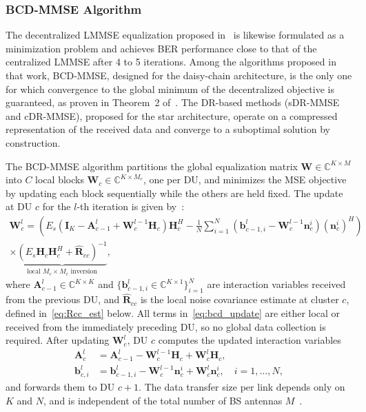 \documentclass[12pt]{article}
\begin{document}
\subsubsection{BCD-MMSE Algorithm}
\label{sec:bcdmmse}

The decentralized LMMSE equalization proposed in~\cite{zhao2025jsac} is
likewise formulated as a minimization problem and achieves BER performance
close to that of the centralized LMMSE after 4 to 5 iterations. Among the
algorithms proposed in that work, BCD-MMSE, designed for the daisy-chain
architecture, is the only one for which convergence to the global minimum
of the decentralized objective is guaranteed, as proven in Theorem~2
of~\cite{zhao2025jsac}. The DR-based methods (sDR-MMSE and cDR-MMSE),
proposed for the star architecture, operate on a compressed representation
of the received data and converge to a suboptimal solution by construction.

The BCD-MMSE algorithm partitions the global equalization matrix
$\mathbf{W} \in \mathbb{C}^{K \times M}$ into $C$ local blocks
$\mathbf{W}_c \in \mathbb{C}^{K \times M_c}$, one per DU, and minimizes
the MSE objective by updating each block sequentially while the others are
held fixed. The update at DU $c$ for the $l$-th iteration is
given by~\cite{zhao2025jsac}:
%
\begin{multline}
  \mathbf{W}_c^l = \left(
    E_s \left(\mathbf{I}_K - \mathbf{A}_{c-1}^l
    + \mathbf{W}_c^{l-1}\mathbf{H}_c\right)\mathbf{H}_c^H
    - \frac{1}{N}\sum_{i=1}^{N}
      \left(\mathbf{b}_{c-1,i}^l - \mathbf{W}_c^{l-1}\mathbf{n}_c^i\right)
      \left(\mathbf{n}_c^i\right)^H
  \right) \\
  \times
  \underbrace{
    \left(E_s \mathbf{H}_c \mathbf{H}_c^H
    + \hat{\mathbf{R}}_{cc}\right)^{-1}
  }_{\text{local } M_c \times M_c \text{ inversion}},
  \label{eq:bcd_update}
\end{multline}
%
where $\mathbf{A}_{c-1}^l \in \mathbb{C}^{K \times K}$ and
$\{\mathbf{b}_{c-1,i}^l \in \mathbb{C}^{K \times 1}\}_{i=1}^{N}$
are interaction variables received from the previous DU, and
$\hat{\mathbf{R}}_{cc}$ is the local noise covariance estimate at cluster
$c$, defined in~\eqref{eq:Rcc_est} below. All terms in~\eqref{eq:bcd_update}
are either local or received from the immediately preceding DU, so no
global data collection is required. After updating $\mathbf{W}_c^l$,
DU $c$ computes the updated interaction variables
%
\begin{align}
  \mathbf{A}_c^l &= \mathbf{A}_{c-1}^l
    - \mathbf{W}_c^{l-1}\mathbf{H}_c
    + \mathbf{W}_c^{l}\mathbf{H}_c, \label{eq:A_update} \\
  \mathbf{b}_{c,i}^l &= \mathbf{b}_{c-1,i}^l
    - \mathbf{W}_c^{l-1}\mathbf{n}_c^i
    + \mathbf{W}_c^{l}\mathbf{n}_c^i, \quad i = 1,\ldots,N,
  \label{eq:b_update}
\end{align}
%
and forwards them to DU $c+1$. The data transfer size per link depends
only on $K$ and $N$, and is independent of the total number of BS
antennas $M$~\cite{zhao2025jsac}.
\end{document}
